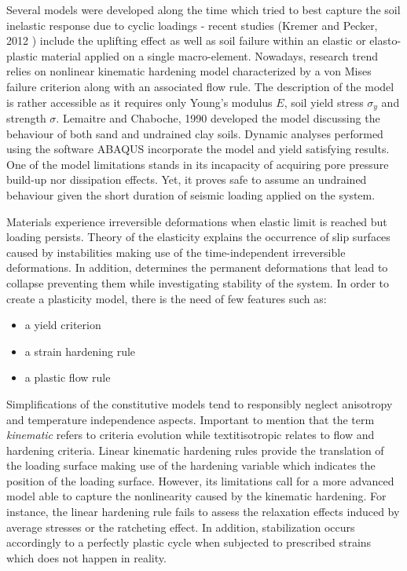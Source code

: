 \documentclass[12pt,a4paper]{report}
\begin{document}
Several models were developed along the time which tried to best capture the soil inelastic response due to cyclic loadings - recent studies (Kremer and Pecker, 2012 \cite{correia2012nonlinear}) include the uplifting effect as well as soil failure within an elastic or elasto-plastic material applied on a single macro-element. Nowadays, research trend relies on nonlinear kinematic hardening model characterized by a von Mises failure criterion along with an associated flow rule. The description of the model is rather accessible as it requires only Young's modulus $E$, soil yield stress $\sigma_y$ and strength $\sigma$. Lemaitre and Chaboche, 1990 \cite{lemaitre1994mechanics} developed the model discussing the behaviour of both sand and undrained clay soils. Dynamic analyses performed using the software ABAQUS incorporate the model and yield satisfying results. One of the model limitations stands in its incapacity of acquiring pore pressure build-up nor dissipation effects. Yet, it proves safe to assume an undrained behaviour given the short duration of seismic loading applied on the system.   

Materials experience irreversible deformations when elastic limit is reached but loading persists. Theory of the elasticity explains the occurrence of slip surfaces caused by instabilities making use of the time-independent irreversible deformations. In addition, determines the permanent deformations that lead to collapse preventing them while investigating stability of the system. 
In order to create a plasticity model, there is the need of few features such as:
\begin{itemize}
	\centering
	\item a yield criterion\
	\item a strain hardening rule\
	\item a plastic flow rule\
\end{itemize}

Simplifications of the constitutive models tend to responsibly neglect anisotropy and \mbox{temperature} independence aspects. Important to mention that the term \textit{kinematic} refers to criteria evolution while textit{isotropic} relates to flow and hardening criteria. Linear kinematic hardening rules provide the translation of the loading surface making use of the hardening variable which indicates the position of the loading surface. However, its limitations call for a more advanced model able to capture the nonlinearity caused by the kinematic hardening. For instance, the linear hardening rule fails to assess the relaxation effects induced by average stresses or the ratcheting effect. In addition, stabilization occurs accordingly to a perfectly plastic cycle when subjected to prescribed strains which does not happen in reality.
\end{document}
